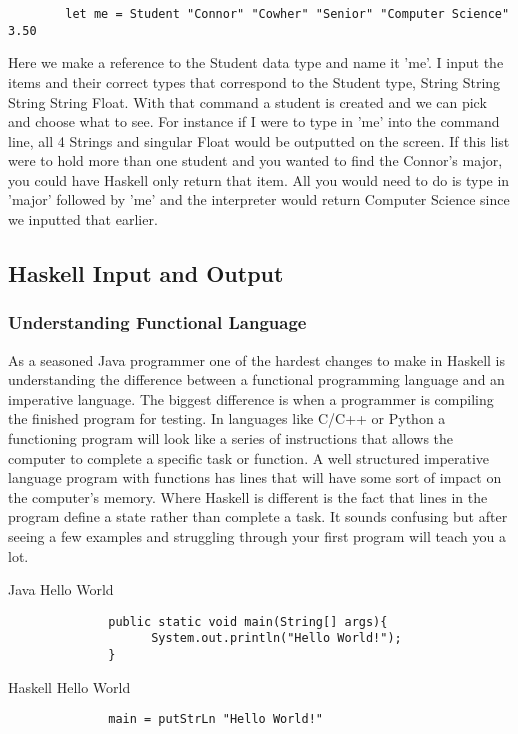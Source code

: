 \documentclass{article}
\begin{document}
    \begin{lstlisting}
        let me = Student "Connor" "Cowher" "Senior" "Computer Science" 3.50
    \end{lstlisting}
    \noindent Here we make a reference to the Student data type and name it 'me'. I input the items and their correct types that correspond to the Student type, String String String String Float. With that command a student is created and we can pick and choose what to see. For instance if I were to type in 'me' into the command line, all 4 Strings and singular Float would be outputted on the screen. If this list were to hold more than one student and you wanted to find the Connor's major, you could have Haskell only return that item. All you would need to do is type in 'major' followed by 'me' and the interpreter would return Computer Science since we inputted that earlier. 
    
\subsection{Haskell Input and Output}
    \subsubsection{Understanding Functional Language}
    As a seasoned Java programmer one of the hardest changes to make in Haskell is understanding the difference between a functional programming language and an imperative language. The biggest difference is when a programmer is compiling the finished program for testing. In languages like C/C++ or Python a functioning program will look like a series of instructions that allows the computer to complete a specific task or function. A well structured imperative language program with functions has lines that will have some sort of impact on the computer's memory. Where Haskell is different is the fact that lines in the program define a state rather than complete a task. It sounds confusing but after seeing a few examples and struggling through your first program will teach you a lot. 
    
    \caption{Java Hello World}
    \begin{lstlisting}
              public static void main(String[] args){
                    System.out.println("Hello World!");
              }
    \end{lstlisting}
    
    \medskip
    \caption{Haskell Hello World}
    \begin{lstlisting}
              main = putStrLn "Hello World!"
    \end{lstlisting}
    
\end{document}
